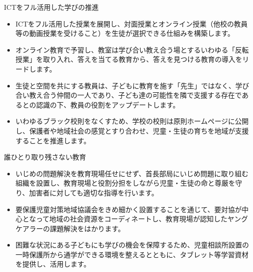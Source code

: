 \documentclass[dvipdfmx]{beamer}
\begin{document}
    \begin{frame}{ICTをフル活用した学びの推進}{}
        \begin{small}
            \begin{itemize}
                \setlength{\itemsep}{2mm}
                \item ICTをフル活用した授業を展開し、対面授業とオンライン授業（他校の教員等の動画授業を受けること）を生徒が選択できる仕組みを構築します。
                \item オンライン教育で予習し、教室は学び合い教え合う場とするいわゆる「反転授業」を取り入れ、答えを当てる教育から、答えを見つける教育の導入をリードします。
                \item 生徒と空間を共にする教員は、子どもに教育を施す「先生」ではなく、学び合い教え合う仲間の一人であり、子ども達の可能性を隣で支援する存在であるとの認識の下、教員の役割をアップデートします。
                \item いわゆるブラック校則をなくすため、学校の校則は原則ホームページに公開し、保護者や地域社会の感覚とすり合わせ、児童・生徒の育ちを地域が支援することを推進します。
            \end{itemize}
        \end{small}
    \end{frame}

    \begin{frame}{誰ひとり取り残さない教育}{}
        \begin{small}
            \begin{itemize}
                \setlength{\itemsep}{2mm}
                \item いじめの問題解決を教育現場任せにせず、首長部局にいじめ問題に取り組む組織を設置し、教育現場と役割分担をしながら児童・生徒の命と尊厳を守り、加害者に対しても適切な指導を行います。
                \item 要保護児童対策地域協議会をきめ細かく設置することを通じて、要対協が中心となって地域の社会資源をコーディネートし、教育現場が認知したヤングケアラーの課題解決をはかります。
                \item 困難な状況にある子どもにも学びの機会を保障するため、児童相談所設置の一時保護所から通学ができる環境を整えるとともに、タブレット等学習資材を提供し、活用します。
            \end{itemize}
        \end{small}
    \end{frame}
\end{document}
